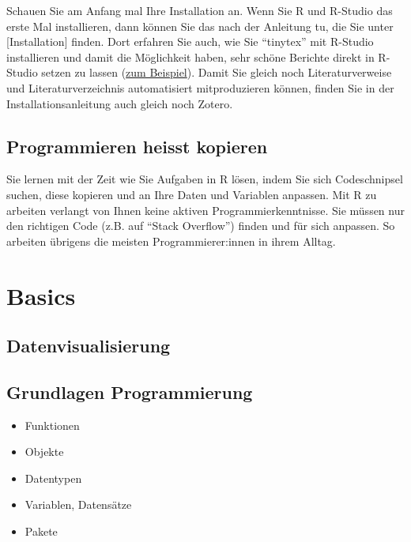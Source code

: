 \documentclass[twoside, pagesize, fontsize=11pt, dvipsnames]{scrreport}
\providecommand{\tightlist}{%
  \setlength{\itemsep}{0pt}\setlength{\parskip}{0pt}}
\begin{document}
Schauen Sie am Anfang mal Ihre Installation an. Wenn Sie R und R-Studio
das erste Mal installieren, dann können Sie das nach der Anleitung tu,
die Sie unter {[}Installation{]} finden. Dort erfahren Sie auch, wie Sie
\enquote{tinytex} mit R-Studio installieren und damit die Möglichkeit
haben, sehr schöne Berichte direkt in R-Studio setzen zu lassen
(\href{./files/Forschungsbericht_UE_3_AG_B.pdf}{zum Beispiel}). Damit
Sie gleich noch Literaturverweise und Literaturverzeichnis automatisiert
mitproduzieren können, finden Sie in der Installationsanleitung auch
gleich noch Zotero.

\hypertarget{programmieren-heisst-kopieren}{%
\section*{Programmieren heisst
kopieren}\label{programmieren-heisst-kopieren}}


Sie lernen mit der Zeit wie Sie Aufgaben in R lösen, indem Sie sich
Codeschnipsel suchen, diese kopieren und an Ihre Daten und Variablen
anpassen. Mit R zu arbeiten verlangt von Ihnen keine aktiven
Programmierkenntnisse. Sie müssen nur den richtigen Code (z.B. auf
\enquote{Stack Overflow}) finden und für sich anpassen. So arbeiten
übrigens die meisten Programmierer:innen in ihrem Alltag.


\hypertarget{basics}{%
\chapter{Basics}\label{basics}}

\hypertarget{datenvisualisierung}{%
\section{Datenvisualisierung}\label{datenvisualisierung}}

\hypertarget{grundlagen-programmierung}{%
\section{Grundlagen Programmierung}\label{grundlagen-programmierung}}

\begin{itemize}
\tightlist
\item
  Funktionen
\item
  Objekte
\item
  Datentypen
\item
  Variablen, Datensätze
\item
  Pakete
\end{itemize}
\end{document}
